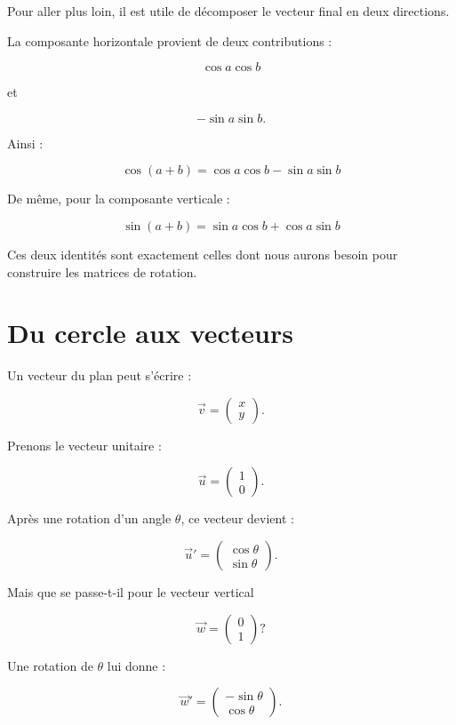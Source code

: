 \documentclass[11pt,a4paper]{article}
\newcommand{\sectiontitle}[1]{
    \section{#1}
}
\begin{document}
Pour aller plus loin, il est utile de décomposer le vecteur
final en deux directions.

La composante horizontale provient de deux contributions :

\[
\cos a\cos b
\]

et

\[
-\sin a\sin b.
\]

Ainsi :

\[
\boxed{
\cos(a+b)
=
\cos a\cos b-\sin a\sin b
}
\]

De même, pour la composante verticale :

\[
\boxed{
\sin(a+b)
=
\sin a\cos b+\cos a\sin b
}
\]

Ces deux identités sont exactement celles dont nous aurons besoin
pour construire les matrices de rotation.


\sectiontitle{Du cercle aux vecteurs}

Un vecteur du plan peut s'écrire :

\[
\vec v=
\begin{pmatrix}
x\\
y
\end{pmatrix}.
\]

Prenons le vecteur unitaire :

\[
\vec u=
\begin{pmatrix}
1\\
0
\end{pmatrix}.
\]

Après une rotation d'un angle $\theta$, ce vecteur devient :

\[
\vec u'=
\begin{pmatrix}
\cos\theta\\
\sin\theta
\end{pmatrix}.
\]

Mais que se passe-t-il pour le vecteur vertical

\[
\vec w=
\begin{pmatrix}
0\\
1
\end{pmatrix}?
\]

Une rotation de $\theta$ lui donne :

\[
\vec w'
=
\begin{pmatrix}
-\sin\theta\\
\cos\theta
\end{pmatrix}.
\]
\end{document}
